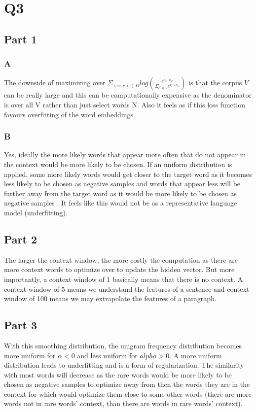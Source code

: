 \documentclass[11pt]{article}
\begin{document}
\section*{Q3}

\subsection*{Part 1}
\subsubsection*{A}
The downside of maximizing over $\Sigma_{(w,c) \in D} log(\frac{e^{v_c \cdot u_w}}{\Sigma_{c^{'} \in V} e^{v_{c^{'}} \cdot u_w}})$ is that the corpus $V$ can be really large
and this can be computationally expensive as the denominator is over all V rather than just select words N. Also it feels as if this loss function favours overfitting of the
word embeddings.

\subsubsection*{B}
Yes, ideally the more likely words that appear more often that do not appear in the context would be more likely to be chosen. If an uniform distribution is applied, some more
likely words would get closer to the target word as it becomes less likely to be chosen as negative samples and words that appear less will be further away from the target word as it would be
more likely to be chosen as negative samples . It feels like this would not be as a representative language model (underfitting). 

\subsection*{Part 2}
The larger the context window, the more costly the computation as there are more context words to optimize over to update the hidden vector. But more importantly, a context
window of 1 basically means that there is no context. A context window of 5 means we understand the features of a sentence and context window of 100 means we may
extrapolate the features of a paragraph.

\subsection*{Part 3}
With this smoothing distribution, the unigram frequency distribution becomes more uniform for $\alpha<0$ and less uniform for $alpha>0$. A more uniform distribution leads to
underfitting and is a form of regularization. The similarity with most words will decrease as the rare words would be more likely to be chosen as negative samples to optimize away from
then the words they are in the context for which would optimize them close to some other words (there are more words not in rare words' context, than there are words in rare words' context). 
\end{document}

